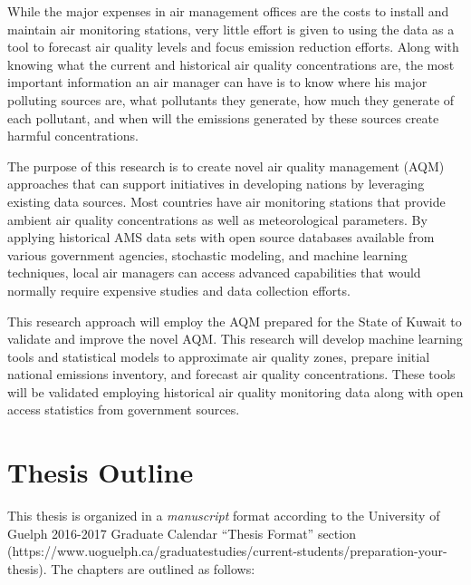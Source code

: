 While the major expenses in air management offices are the costs to install and maintain air monitoring stations, very little effort is given to using the data as a tool to forecast air quality levels and focus emission reduction efforts. Along with knowing what the current and historical air quality concentrations are, the most important information an air manager can have is to know where his major polluting sources are, what pollutants they generate, how much they generate of each pollutant, and when will the emissions generated by these sources create harmful concentrations.

The purpose of this research is to create novel air quality management (AQM) approaches that can support initiatives in developing nations by leveraging existing data sources. Most countries have air monitoring stations that provide ambient air quality concentrations as well as meteorological parameters. By applying historical AMS data sets with open source databases available from various government agencies, stochastic modeling, and machine learning techniques, local air managers can access advanced capabilities that would normally require expensive studies and data collection efforts.

This research approach will employ the AQM prepared for the State of Kuwait to validate and improve the novel AQM. This research will develop machine learning tools and statistical models to approximate air quality zones, prepare initial national emissions inventory, and forecast air quality concentrations.  These tools will be validated employing historical air quality monitoring data along with open access statistics from government sources.

\section{Thesis Outline}
This thesis is organized in a \textit{manuscript} format according to the University of Guelph 2016-2017 Graduate Calendar ``Thesis Format'' section (https://www.uoguelph.ca/graduatestudies/current-students/preparation-your-thesis).  The chapters are outlined as follows:

